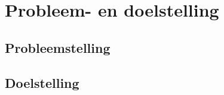 \documentclass{book}
\begin{document}
\chapter{Probleem- en doelstelling}
\section{Probleemstelling}

\section{Doelstelling}
\end{document}
